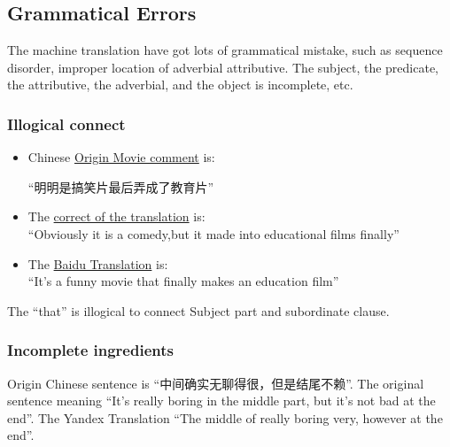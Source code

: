 \documentclass[conference]{IEEEtran}
\begin{document}
\begin{CJK*}{UTF8}{gbsn}
\subsection{Grammatical Errors}
The machine translation have got lots of grammatical mistake, such as sequence
disorder, improper location of adverbial attributive. The subject, the
predicate, the attributive, the adverbial, and the object is incomplete, etc.
\subsubsection{Illogical connect}
\begin{itemize}
\item Chinese \underline{Origin Movie comment} is:
  \begin{center}
    ``明明是搞笑片最后弄成了教育片''
  \end{center}
\item The \underline{correct of the translation} is:\\
  ``Obviously it is a comedy,but it made into educational films finally''
\item The \underline{Baidu Translation} is:\\
  ``It's a funny movie that finally makes an education film''
\end{itemize}
The ``that'' is illogical to connect Subject part and subordinate clause.
\subsubsection{Incomplete ingredients}
Origin Chinese sentence is ``中间确实无聊得很，但是结尾不赖''. The original
sentence meaning ``It's really boring in the middle part, but it's not bad at
the end''. The Yandex Translation ``The middle of really boring very, however at the end''.

\end{CJK*}
\end{document}
